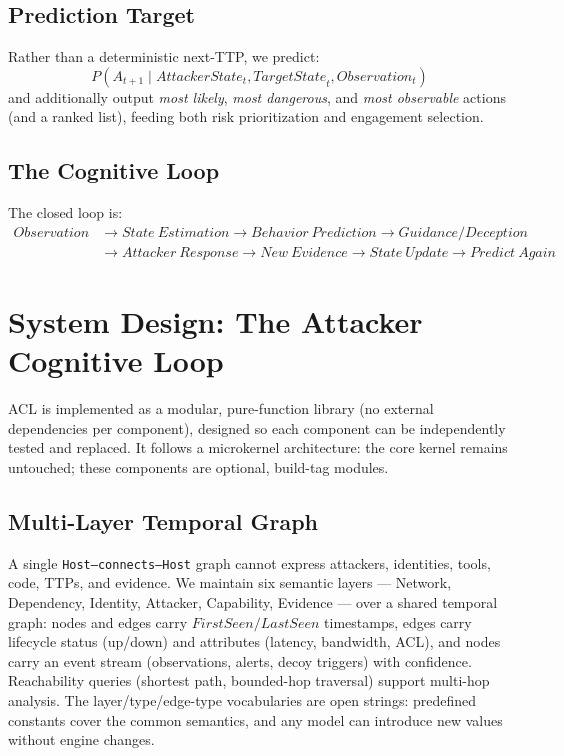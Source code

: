 \documentclass[preprints,article,accept,oneauthor]{Definitions/mdpi}
\newcommand{\act}[1]{\texttt{#1}}
\begin{document}
\subsection{Prediction Target}
\label{sec:prediction-target}

Rather than a deterministic next-TTP, we predict:
\[
P(A_{t+1} \mid \mathit{AttackerState}_t, \mathit{TargetState}_t,
\mathit{Observation}_t)
\]
and additionally output \textit{most likely}, \textit{most dangerous}, and
\textit{most observable} actions (and a ranked list), feeding both risk
prioritization and engagement selection.

\subsection{The Cognitive Loop}
\label{sec:loop}

The closed loop is:
\[
\begin{aligned}
\mathit{Observation} &\to \mathit{State\ Estimation}
\to \mathit{Behavior\ Prediction}
\to \mathit{Guidance/Deception} \\
&\to \mathit{Attacker\ Response}
\to \mathit{New\ Evidence}
\to \mathit{State\ Update}
\to \mathit{Predict\ Again}
\end{aligned}
\]

\section{System Design: The Attacker Cognitive Loop}
\label{sec:design}

ACL is implemented as a modular, pure-function library (no external
dependencies per component), designed so each component can be independently
tested and replaced. It follows a microkernel architecture: the core kernel
remains untouched; these components are optional, build-tag modules.

\subsection{Multi-Layer Temporal Graph}
\label{sec:graph}

A single \act{Host--connects--Host} graph cannot express attackers,
identities, tools, code, TTPs, and evidence. We maintain six semantic layers
--- Network, Dependency, Identity, Attacker, Capability, Evidence --- over a
shared temporal graph: nodes and edges carry
$\mathit{FirstSeen}/\mathit{LastSeen}$ timestamps, edges carry lifecycle
status (up/down) and attributes (latency, bandwidth, ACL), and nodes carry an
event stream (observations, alerts, decoy triggers) with confidence.
Reachability queries (shortest path, bounded-hop traversal) support
multi-hop analysis. The layer/type/edge-type vocabularies are open strings:
predefined constants cover the common semantics, and any model can introduce
new values without engine changes.
\end{document}
